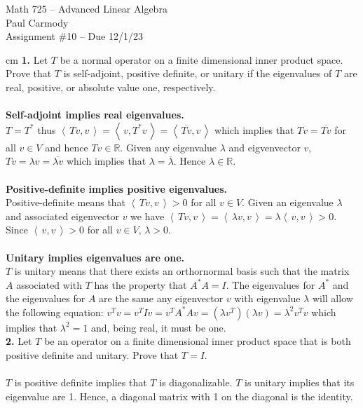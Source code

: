 \documentclass[11pt]{amsart}
\theoremstyle{definition}  %
\newcommand{\R}{\mathbb{R}}
\newcommand{\IP}[1]{\left \langle\, #1 \,\right \rangle}
\begin{document}
\begin{center}
\Large{Math 725 -- Advanced Linear Algebra}\\
\large{Paul Carmody}\\
Assignment \#10 -- Due 12/1/23
\end{center}

 cm
\noindent
{\bf 1.} Let $T$ be a normal operator on a finite dimensional inner product space. Prove that $T$ is self-adjoint, positive definite, or unitary if the eigenvalues  of $T$ are 
real, positive, or absolute value one, respectively. \\
\\
\textbf{Self-adjoint implies real eigenvalues.}\\
\indent $T=T^*$ thus $\IP{Tv,v} = \IP{v,T^*v} = \IP{\overline{Tv}, v}$ which implies that $Tv=\overline{Tv}$ for all $v \in V$ and hence $Tv \in \R$.  Given any eigenvalue $\lambda$ and eigvenvector $v$, $Tv=\lambda v=\overline{\lambda v}$ which implies that $\lambda = \overline{\lambda}$.  Hence $\lambda \in \R$.\\
\\
\textbf{Positive-definite implies positive eigenvalues.}\\
\indent Positive-definite means that $\IP{Tv,v}>0$ for all $v \in V$.  Given an eigenvalue $\lambda$ and associated eigenvector $v$ we have $\IP{Tv,v}=\IP{\lambda v,v} = \lambda \IP{v,v} > 0$.  Since $\IP{v,v}> 0$ for all $v \in V, \, \lambda > 0.$\\
\\
\textbf{Unitary implies eigenvalues are one.}\\
\indent $T$ is unitary means that there exists an orthornormal basis such that the matrix $A$ associated with $T$ has the property that $A^*A = I$.  The eigenvalues for $A^*$ and the eigenvalues for $A$ are the same any eigenvector $v$ with eigenvalue $\lambda$ will allow the following equation: $v^Tv=v^TIv=v^TA^*Av= (\lambda v^T)(\lambda v)=\lambda^2 v^T v$ which implies that $\lambda^2=1$ and, being real, it must be one.
\\

\vskip 0.1cm
\noindent
{\bf 2.} Let $T$ be an operator on a finite dimensional inner product space that is both positive definite and unitary. Prove that $T= I$. \\
\\
$T$ is positive definite implies that $T$ is diagonalizable.  $T$ is unitary implies that its eigenvalue are 1.  Hence, a diagonal matrix with 1 on the diagonal is the identity.
\\
\end{document}
